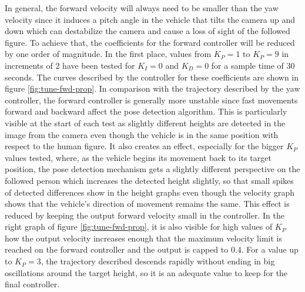 In general, the forward velocity will always need to be smaller than the yaw velocity since it induces a pitch angle in the vehicle that tilts the camera up and down which can destabilize the camera and cause a loss of sight of the followed figure.
To achieve that, the coefficients for the forward controller will be reduced by one order of magnitude.
In the first place, values from $K_P=1$ to $K_P=9$ in increments of 2 have been tested for $K_I=0$ and $K_D=0$ for a sample time of 30 seconds.
The curves described by the controller for these coefficients are shown in figure \ref{fig:tune-fwd-prop}.
In comparison with the trajectory described by the yaw controller, the forward controller is generally more unstable since fast movements forward and backward affect the pose detection algorithm.
This is particularly visible at the start of each test as slightly different heights are detected in the image from the camera even though the vehicle is in the same position with respect to the human figure.
It also creates an effect, especially for the bigger $K_P$ values tested, where, as the vehicle begins its movement back to its target position, the pose detection mechanism gets a slightly different perspective on the followed person which increases the detected height slightly, so that small spikes of detected differences show in the height graphs even though the velocity graph shows that the vehicle's direction of movement remains the same.
This effect is reduced by keeping the output forward velocity small in the controller.
In the right graph of figure \ref{fig:tune-fwd-prop}, it is also visible for high values of $K_P$ how the output velocity increases enough that the maximum velocity limit is reached on the forward controller and the output is capped to 0.4.
For a value up to $K_P=3$, the trajectory described descends rapidly without ending in big oscillations around the target height, so it is an adequate value to keep for the final controller.


